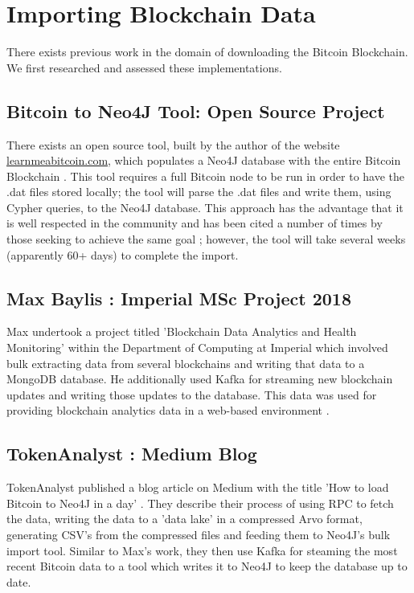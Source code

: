 \section{Importing Blockchain Data}\label{design-db-previous-work}
There exists previous work in the domain of downloading the Bitcoin Blockchain. We first researched and assessed these implementations. 

\subsection{Bitcoin to Neo4J Tool: Open Source Project}
There exists an open source tool, built by the author of the website \url{learnmeabitcoin.com}, which populates a Neo4J database with the entire Bitcoin Blockchain \cite{RefWorks:doc:5c98e031e4b068320632cef2}. This tool requires a full Bitcoin node to be run in order to have the .dat files stored locally; the tool will parse the .dat files and write them, using Cypher queries, to the Neo4J database. This approach has the advantage that it is well respected in the community and has been cited a number of times by those seeking to achieve the same goal \cite{RefWorks:doc:5c98e0cde4b044512c0b8641}; however, the tool will take several weeks (apparently 60+ days) to complete the import. 

\subsection{Max Baylis : Imperial MSc Project 2018}\label{background-max-baylist-project}
Max undertook a project titled 'Blockchain Data Analytics and Health Monitoring' within the Department of Computing at Imperial \cite{RefWorks:doc:5c6bd151e4b041254f892045} which involved bulk extracting data from several blockchains and writing that data to a MongoDB database. He additionally used Kafka for streaming new blockchain updates and writing those updates to the database. This data was used for providing blockchain analytics data in a web-based environment \cite{RefWorks:doc:5c6bd151e4b041254f892045}. 

\subsection{TokenAnalyst : Medium Blog}
TokenAnalyst published a blog article on Medium with the title 'How to load Bitcoin to Neo4J in a day' \cite{RefWorks:doc:5c98e0cde4b044512c0b8641}. They describe their process of using RPC to fetch the data, writing the data to a 'data lake' in a compressed Arvo format, generating CSV's from the compressed files and feeding them to Neo4J's bulk import tool. Similar to Max's work, they then use Kafka for steaming the most recent Bitcoin data to a tool which writes it to Neo4J to keep the database up to date. 

